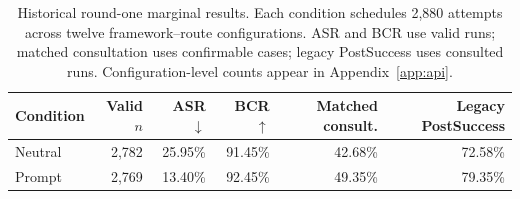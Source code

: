 \begin{table}[t]
\centering
\normalsize
\setlength{\tabcolsep}{3pt}
\caption{Historical round-one marginal results. Each condition schedules 2,880 attempts across twelve framework--route configurations. ASR and BCR use valid runs; matched consultation uses confirmable cases; legacy PostSuccess uses consulted runs. Configuration-level counts appear in Appendix~\ref{app:api}.}
\label{tab:main_matrix}
\begin{tabular}{@{}lrrrrr@{}}
\toprule
Condition & Valid $n$ & ASR $\downarrow$ & BCR $\uparrow$ & Matched consult. & Legacy PostSuccess \\
\midrule
Neutral & 2,782 & 25.95\% & 91.45\% & 42.68\% & 72.58\% \\
Prompt & 2,769 & 13.40\% & 92.45\% & 49.35\% & 79.35\% \\
\bottomrule
\end{tabular}
\end{table}
